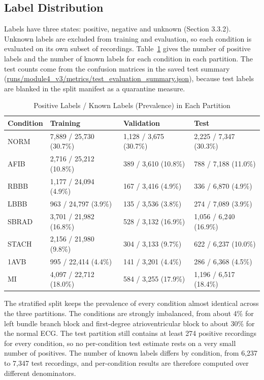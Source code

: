 \subsection{Label Distribution}\label{sec:ch4_1_3}

Labels have three states: positive, negative and unknown (Section 3.3.2). Unknown labels are excluded from training and evaluation, so each condition is evaluated on its own subset of recordings. Table~\ref{tab:ch4_3} gives the number of positive labels and the number of known labels for each condition in each partition. The test counts come from the confusion matrices in the saved test summary (\url{runs/module4_v3/metrics/test_evaluation_summary.json}), because test labels are blanked in the split manifest as a quarantine measure.

\begin{table}[htbp]
\centering
\small
\setlength{\tabcolsep}{2pt}
\renewcommand{\arraystretch}{1.12}
\caption{Positive Labels / Known Labels (Prevalence) in Each Partition}\label{tab:ch4_3}
\begin{tabular}{|p{}|p{}|p{}|p{}|}
\hline
\textbf{Condition} & \textbf{Training} & \textbf{Validation} & \textbf{Test} \\ \hline
NORM & 7,889 / 25,730 (30.7\%) & 1,128 / 3,675 (30.7\%) & 2,225 / 7,347 (30.3\%) \\ \hline
AFIB & 2,716 / 25,212 (10.8\%) & 389 / 3,610 (10.8\%) & 788 / 7,188 (11.0\%) \\ \hline
RBBB & 1,177 / 24,094 (4.9\%) & 167 / 3,416 (4.9\%) & 336 / 6,870 (4.9\%) \\ \hline
LBBB & 963 / 24,797 (3.9\%) & 135 / 3,536 (3.8\%) & 274 / 7,089 (3.9\%) \\ \hline
SBRAD & 3,701 / 21,982 (16.8\%) & 528 / 3,132 (16.9\%) & 1,056 / 6,240 (16.9\%) \\ \hline
STACH & 2,156 / 21,980 (9.8\%) & 304 / 3,133 (9.7\%) & 622 / 6,237 (10.0\%) \\ \hline
1AVB & 995 / 22,414 (4.4\%) & 141 / 3,201 (4.4\%) & 286 / 6,368 (4.5\%) \\ \hline
MI & 4,097 / 22,712 (18.0\%) & 584 / 3,255 (17.9\%) & 1,196 / 6,517 (18.4\%) \\ \hline
\end{tabular}
\end{table}

The stratified split keeps the prevalence of every condition almost identical across the three partitions. The conditions are strongly imbalanced, from about 4\% for left bundle branch block and first-degree atrioventricular block to about 30\% for the normal ECG. The test partition still contains at least 274 positive recordings for every condition, so no per-condition test estimate rests on a very small number of positives. The number of known labels differs by condition, from 6,237 to 7,347 test recordings, and per-condition results are therefore computed over different denominators.

